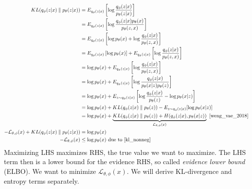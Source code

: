 \documentclass{article}
\numberwithin{equation}{subsection}
\begin{document}
\begin{align}
KL(q_\phi(z|x) \parallel p_\theta(z|x))
&=E_{q_\phi(z|x)}\left[ \log\frac{q_\phi(z|x)}{p_\theta(z|x)}\right]\\
&=E_{q_\phi(z|x)}\left[ \log\frac{q_\phi(z|x)p_\theta(x)}{p_\theta(z,x)}\right]\\
&=E_{q_\phi(z|x)}\left[ \log p_\theta(x) + \log\frac{q_\phi(z|x)}{p_\theta(z,x)}\right]\\
&=E_{q_\phi(z|x)}\left[\log p_\theta(x)\right] + E_{q_\phi(z|x)}\left[\log\frac{q_\phi(z|x)}{p_\theta(z,x)}\right]\\
&=\log p_\theta(x) + E_{q_\phi(z|x)}\left[\log\frac{q_\phi(z|x)}{p_\theta(z,x)}\right]\\
&=\log p_\theta(x) + E_{q_\phi(z|x)}\left[\log\frac{q_\phi(z|x)}{p_\theta(x|z)p_\theta(z)}\right]\\
&=\log p_\theta(x) + E_{z\sim q_\phi(z|x)}\left[\log \frac{q_\phi(z|x)}{p_\theta(z)} - \log p_\theta(x| z)\right]\\
&=\log p_\theta(x) + KL(q_\phi(z|x) \parallel p_\theta(z)) - E_{z\sim q_\phi(z|x)}[\log p_\theta(x|z)]\\
&=\log p_\theta(x) + \underbrace{KL(q_\phi(z|x) \parallel p_\theta(z)) + H(q_\phi(z|x), p_\theta(x|z))}_{\mathcal{L}_{\theta, \phi}(x)}~\cite{weng_vae_2018}\\
-\mathcal{L}_{\theta, \phi}(x)+KL(q_\phi(z|x) \parallel p_\theta(z|x)) &= \log p_\theta(x)\\
-\mathcal{L}_{\theta, \phi}(x) &\leq \log p_\theta(x)\ \text{due to~\ref{kl_nonneg}} \label{vae_elbo}
\end{align}
Maximizing LHS maximizes RHS, the true value we want to maximize. The LHS term then is a lower bound for the evidence RHS, so called \textit{evidence lower bound} (ELBO). We want to minimize $\mathcal{L}_{\theta, \phi}(x)$. We will derive KL-divergence and entropy terms separately.
\end{document}
